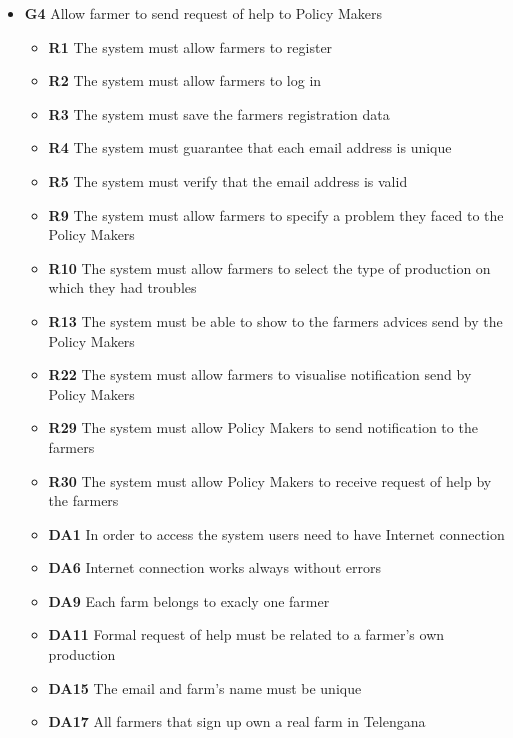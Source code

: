 \begin{itemize}
\item \textbf{G4} Allow farmer to send request of help to Policy Makers
    \begin{itemize}
    \renewcommand\labelitemi{--}
    \item \textbf{R1} The system must allow farmers to register
    \item \textbf{R2} The system must allow farmers to log in
    \item \textbf{R3} The system must save the farmers registration data
    \item \textbf{R4} The system must guarantee that each email address is unique
    \item \textbf{R5} The system must verify that the email address is valid
    \item \textbf{R9} The system must allow farmers to specify a problem they faced to the Policy Makers
    \item \textbf{R10} The system must allow farmers to select the type of production on which they had troubles
    \item \textbf{R13} The system must be able to show to the farmers advices send by the Policy Makers
    \item \textbf{R22} The system must allow farmers to visualise notification send by Policy Makers
    \item \textbf{R29} The system must allow Policy Makers to send notification to the farmers
    \item \textbf{R30} The system must allow Policy Makers to receive request of help by the farmers
    \item \textbf{DA1} In order to access the system users need to have Internet connection
    \item \textbf{DA6} Internet connection works always without errors
    \item \textbf{DA9} Each farm belongs to exacly one farmer
    \item \textbf{DA11} Formal request of help must be related to a farmer's own production
    \item \textbf{DA15} The email and farm's name must be unique
    \item \textbf{DA17} All farmers that sign up own a real farm in Telengana
    \end{itemize} 


\end{itemize}

